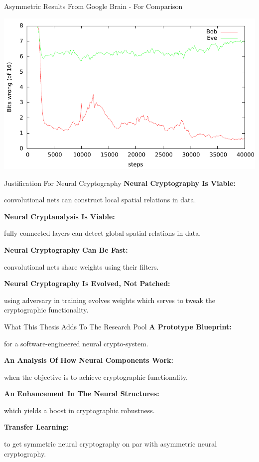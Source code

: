 \documentclass{beamer}
\begin{document}
		\begin{frame}{Asymmetric Results From Google Brain - For Comparison}
			\begin{center}
				\includegraphics[height=0.8\textheight]{pubkey_bob_v_eve}
			\end{center}
		\end{frame}
		\begin{frame}{Justification For Neural Cryptography}
			 \vfill
			 \textbf{Neural Cryptography Is Viable:}\\
			 {\centering
			 	convolutional nets can construct local spatial relations in data.
			 	\par}
			 \vfill
			 \textbf{Neural Cryptanalysis Is Viable:}\\
			 {\centering
			 	fully connected layers can detect global spatial relations in data.
			 	\par}
			 \vfill
			 \textbf{Neural Cryptography Can Be Fast:}\\
			 {\centering
			 	convolutional nets share weights using their filters.
			 	\par}
			 \vfill
			 \textbf{Neural Cryptography Is Evolved, Not Patched:}\\
			 {\centering
			 	using adversary in training evolves weights which serves to tweak the cryptographic functionality.
			 	\par}
		\end{frame}
		\begin{frame}{What This Thesis Adds To The Research Pool}
			\vfill
			\textbf{A Prototype Blueprint:}\\
			{\centering
				for a software-engineered neural crypto-system.
				\par}
			\vfill
			\textbf{An Analysis Of How Neural Components Work:}\\
			{\centering
				when the objective is to achieve cryptographic functionality.
				\par}
			\vfill
			\textbf{An Enhancement In The Neural Structures:}\\
			{\centering
				which yields a boost in cryptographic robustness.
			\par}
			\vfill
			\textbf{Transfer Learning:}\\
			{\centering
				to get symmetric neural cryptography on par with asymmetric neural cryptography.
			\par}
		\end{frame}
\end{document}
